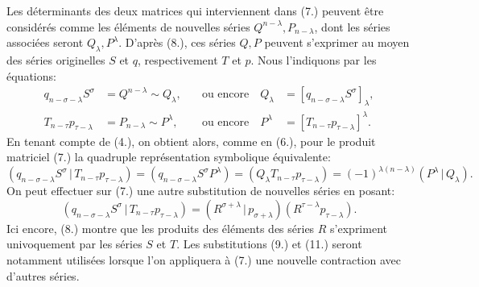\documentclass[11pt]{article}
\newcommand{\pair}[2]{(#1\,|\,#2)}
\begin{document}
Les déterminants des deux matrices qui interviennent dans (7.) peuvent être considérés comme les éléments de nouvelles séries $Q^{n-\lambda},P_{n-\lambda}$, dont les séries associées seront $Q_\lambda,P^\lambda$. D'après (8.), ces séries $Q,P$ peuvent s'exprimer au moyen des séries originelles $S$ et $q$, respectivement $T$ et $p$. Nous l'indiquons par les équations:
\begin{equation}
\begin{aligned}
 q_{n-\sigma-\lambda}S^\sigma&=Q^{n-\lambda}\sim Q_\lambda, &\quad\text{ou encore}\quad Q_\lambda&=[q_{n-\sigma-\lambda}S^\sigma]_\lambda,\\
 T_{n-\tau}p_{\tau-\lambda}&=P_{n-\lambda}\sim P^\lambda, &\quad\text{ou encore}\quad P^\lambda&=[T_{n-\tau}p_{\tau-\lambda}]^\lambda.
\end{aligned}
\tag{9}
\end{equation}
En tenant compte de (4.), on obtient alors, comme en (6.), pour le produit matriciel (7.) la quadruple représentation symbolique équivalente:
\begin{equation}
\pair{q_{n-\sigma-\lambda}S^\sigma}{T_{n-\tau}p_{\tau-\lambda}}
=(q_{n-\sigma-\lambda}S^\sigma P^\lambda)=(Q_\lambda T_{n-\tau}p_{\tau-\lambda})=(-1)^{\lambda(n-\lambda)}\pair{P^\lambda}{Q_\lambda}.
\tag{10}
\end{equation}
On peut effectuer sur (7.) une autre substitution de nouvelles séries en posant:
\begin{equation}
 \pair{q_{n-\sigma-\lambda}S^\sigma}{T_{n-\tau}p_{\tau-\lambda}}
 =\pair{R^{\sigma+\lambda}}{p_{\sigma+\lambda}}(R^{\tau-\lambda}p_{\tau-\lambda}).
\tag{11}
\end{equation}
Ici encore, (8.) montre que les produits des éléments des séries $R$ s'expriment univoquement par les séries $S$ et $T$. Les substitutions (9.) et (11.) seront notamment utilisées lorsque l'on appliquera à (7.) une nouvelle contraction avec d'autres séries.
\end{document}

